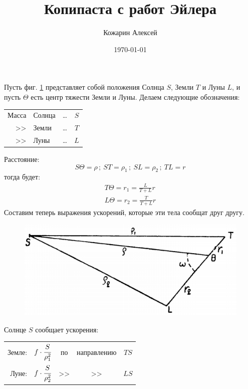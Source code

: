 \documentclass[a4paper,12pt]{article}
\author{Кожарин Алексей}
\title{Копипаста с работ Эйлера}
\date{\today}
\begin{document}
	\maketitle
	\section{}
	Пусть фиг. \ref{fig21} представляет собой положения Солнца $S$, Земли $T$ и Луны $L$, и пусть $\Theta$ есть центр тяжести Земли и Луны. Делаем следующие обозначения:
	
	\begin{table}[h]
		\begin{center}
			\begin{tabular}{rlcc}
				Масса & Солнца & \dots & $S$ \\
				>> & Земли & \dots & $T$ \\
				>> & Луны & \dots & $L$
			\end{tabular}
		\end{center}
	\end{table}

	Расстояние:
	\[
	S \Theta = \rho\,;~ ST = \rho_1\,;~ SL = \rho_2\,;~ TL = r
	\]
	тогда будет:
	\begin{equation}
		\begin{aligned}
			T \Theta = r_1 = \frac{L}{T+L} r \\
			L \Theta = r_2 = \frac{T}{T+L} r
		\end{aligned}
	\end{equation}
	Составим теперь выражения ускорений, которые эти тела сообщат друг другу.
	\begin{figure}[!h]
		\centering
		\label{fig21}
		\caption{}
		\includegraphics[width=0.45\linewidth]{fig21}
	\end{figure}

	Солнце $S$ сообщает ускорения:
	\begin{table}[!h]
		\centering
		\begin{tabular}{rcccc}
			Земле: & $f \cdot \cfrac{S}{\rho_1^2}$ & по & направлению & $TS$ \\[5mm]
			Луне: & $f \cdot \cfrac{S}{\rho_2^2}$ & >> & >>  & $LS$
		\end{tabular}
	\end{table}
\end{document}
